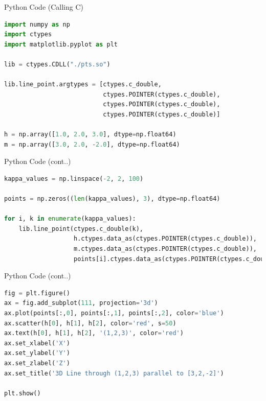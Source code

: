 \documentclass{beamer}
\begin{document}
\begin{frame}[fragile]{Python Code (Calling C)}
\begin{lstlisting}[language=Python]
import numpy as np
import ctypes
import matplotlib.pyplot as plt

lib = ctypes.CDLL("./pts.so")

lib.line_point.argtypes = [ctypes.c_double,
                           ctypes.POINTER(ctypes.c_double),
                           ctypes.POINTER(ctypes.c_double),
                           ctypes.POINTER(ctypes.c_double)]

h = np.array([1.0, 2.0, 3.0], dtype=np.float64)
m = np.array([3.0, 2.0, -2.0], dtype=np.float64)
\end{lstlisting}
\end{frame}

\begin{frame}[fragile]{Python Code (cont..)}
\begin{lstlisting}[language=Python]
kappa_values = np.linspace(-2, 2, 100)

points = np.zeros((len(kappa_values), 3), dtype=np.float64)

for i, k in enumerate(kappa_values):
    lib.line_point(ctypes.c_double(k),
                   h.ctypes.data_as(ctypes.POINTER(ctypes.c_double)),
                   m.ctypes.data_as(ctypes.POINTER(ctypes.c_double)),
                   points[i].ctypes.data_as(ctypes.POINTER(ctypes.c_double)))
\end{lstlisting}
\end{frame}

\begin{frame}[fragile]{Python Code (cont..)}
\begin{lstlisting}[language=Python]
fig = plt.figure()
ax = fig.add_subplot(111, projection='3d')
ax.plot(points[:,0], points[:,1], points[:,2], color='blue')
ax.scatter(h[0], h[1], h[2], color='red', s=50)
ax.text(h[0], h[1], h[2], '(1,2,3)', color='red')
ax.set_xlabel('X')
ax.set_ylabel('Y')
ax.set_zlabel('Z')
ax.set_title('3D Line through (1,2,3) parallel to [3,2,-2]')

plt.show()
\end{lstlisting}
\end{frame}
\end{document}
